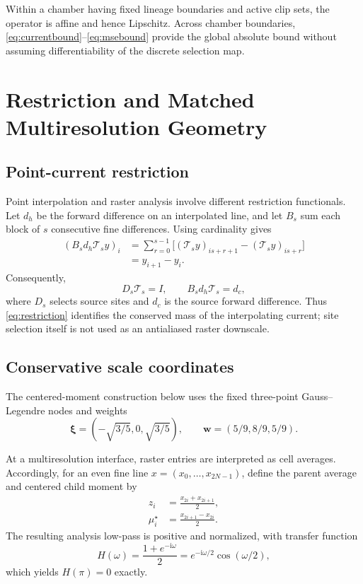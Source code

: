 \documentclass[journal]{IEEEtran}
\newcommand{\Tcal}{\mathcal{T}}
\begin{document}
Within a chamber having fixed lineage boundaries and active clip sets, the
operator is affine and hence Lipschitz. Across chamber boundaries,
\eqref{eq:currentbound}--\eqref{eq:msebound} provide the global absolute
bound without assuming differentiability of the discrete selection map.

\section{Restriction and Matched Multiresolution Geometry}

\subsection{Point-current restriction}

Point interpolation and raster analysis involve different restriction
functionals. Let \(d_h\) be the forward difference on an interpolated line,
and let \(B_s\) sum each block of \(s\) consecutive fine differences. Using
cardinality gives
\begin{align}
 (B_s d_h\Tcal_s y)_i
 &=\sum_{r=0}^{s-1}
 \bigl[(\Tcal_s y)_{is+r+1}-(\Tcal_s y)_{is+r}\bigr]\nonumber\\
 &=y_{i+1}-y_i.
 \label{eq:telescoping}
\end{align}
Consequently,
\begin{equation}
 D_s\Tcal_s=I,\qquad B_s d_h\Tcal_s=d_c,
 \label{eq:restriction}
\end{equation}
where \(D_s\) selects source sites and \(d_c\) is the source forward
difference. Thus \eqref{eq:restriction} identifies the conserved mass of the
interpolating current; site selection itself is not used as an antialiased
raster downscale.

\subsection{Conservative scale coordinates}

The centered-moment construction below uses the fixed three-point
Gauss--Legendre nodes and weights
\begin{equation}
 \bm\xi=(-\sqrt{3/5},0,\sqrt{3/5}),\qquad
 \bm w=(5/9,8/9,5/9).
 \label{eq:gauss3}
\end{equation}

At a multiresolution interface, raster entries are interpreted as cell
averages. Accordingly, for an even fine line
\(x=(x_0,\ldots,x_{2N-1})\), define the parent average and centered child
moment by
\begin{align}
 z_i&=\frac{x_{2i}+x_{2i+1}}{2},
 \label{eq:scaleaverage}\\
 \mu_i^\star&=\frac{x_{2i+1}-x_{2i}}{2}.
 \label{eq:actualmoment}
\end{align}
The resulting analysis low-pass is positive and normalized, with transfer
function
\begin{equation}
 H(\omega)=\frac{1+e^{-\mathrm i\omega}}{2}
 =e^{-\mathrm i\omega/2}\cos(\omega/2),
 \label{eq:nyquistresponse}
\end{equation}
which yields \(H(\pi)=0\) exactly.
\end{document}
